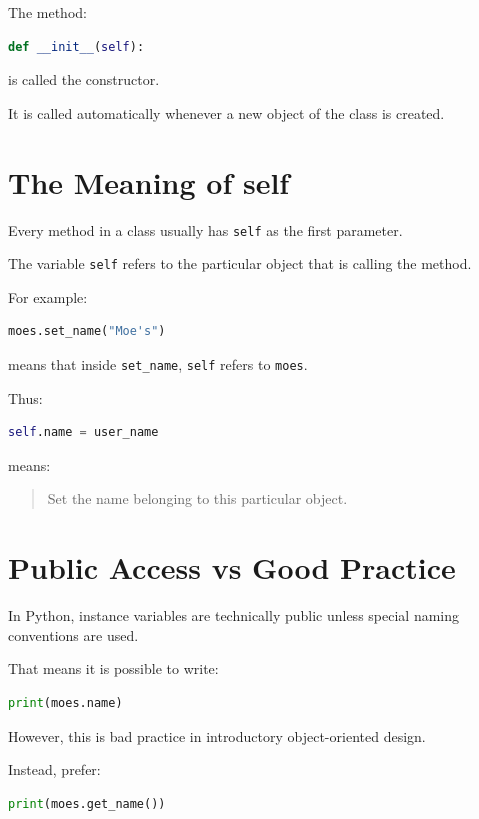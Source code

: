\documentclass[11pt]{article}
\begin{document}
The method:

\begin{lstlisting}[language=Python]
def __init__(self):
\end{lstlisting}

is called the constructor.

It is called automatically whenever a new object of the class is created.

\section{The Meaning of self}

Every method in a class usually has \verb|self| as the first parameter.

The variable \verb|self| refers to the particular object that is calling the method.

For example:

\begin{lstlisting}[language=Python]
moes.set_name("Moe's")
\end{lstlisting}

means that inside \verb|set_name|, \verb|self| refers to \verb|moes|.

Thus:

\begin{lstlisting}[language=Python]
self.name = user_name
\end{lstlisting}

means:

\begin{quote}
Set the name belonging to this particular object.
\end{quote}

\section{Public Access vs Good Practice}

In Python, instance variables are technically public unless special naming conventions are used.

That means it is possible to write:

\begin{lstlisting}[language=Python]
print(moes.name)
\end{lstlisting}

However, this is bad practice in introductory object-oriented design.

Instead, prefer:

\begin{lstlisting}[language=Python]
print(moes.get_name())
\end{lstlisting}
\end{document}
